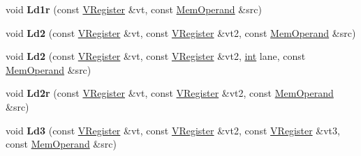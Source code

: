 \begin{DoxyCompactItemize}
\item 
\mbox{\label{classv8_1_1internal_1_1MacroAssembler_aecf9ff406b81bcdd68ef0f9923f365d9}} 
void {\bfseries Ld1r} (const \mbox{\hyperlink{classv8_1_1internal_1_1VRegister}{V\+Register}} \&vt, const \mbox{\hyperlink{classv8_1_1internal_1_1MemOperand}{Mem\+Operand}} \&src)
\item 
\mbox{\label{classv8_1_1internal_1_1MacroAssembler_a29ad0e5ae7627135ffb549f0e2cc3e3e}} 
void {\bfseries Ld2} (const \mbox{\hyperlink{classv8_1_1internal_1_1VRegister}{V\+Register}} \&vt, const \mbox{\hyperlink{classv8_1_1internal_1_1VRegister}{V\+Register}} \&vt2, const \mbox{\hyperlink{classv8_1_1internal_1_1MemOperand}{Mem\+Operand}} \&src)
\item 
\mbox{\label{classv8_1_1internal_1_1MacroAssembler_a8aad478ed21bbff042b26b15b8e39895}} 
void {\bfseries Ld2} (const \mbox{\hyperlink{classv8_1_1internal_1_1VRegister}{V\+Register}} \&vt, const \mbox{\hyperlink{classv8_1_1internal_1_1VRegister}{V\+Register}} \&vt2, \mbox{\hyperlink{classint}{int}} lane, const \mbox{\hyperlink{classv8_1_1internal_1_1MemOperand}{Mem\+Operand}} \&src)
\item 
\mbox{\label{classv8_1_1internal_1_1MacroAssembler_abaae01975749e6f64a98a1503fdacd02}} 
void {\bfseries Ld2r} (const \mbox{\hyperlink{classv8_1_1internal_1_1VRegister}{V\+Register}} \&vt, const \mbox{\hyperlink{classv8_1_1internal_1_1VRegister}{V\+Register}} \&vt2, const \mbox{\hyperlink{classv8_1_1internal_1_1MemOperand}{Mem\+Operand}} \&src)
\item 
\mbox{\label{classv8_1_1internal_1_1MacroAssembler_adec6082ef1ef396d749b9d223c0b1e65}} 
void {\bfseries Ld3} (const \mbox{\hyperlink{classv8_1_1internal_1_1VRegister}{V\+Register}} \&vt, const \mbox{\hyperlink{classv8_1_1internal_1_1VRegister}{V\+Register}} \&vt2, const \mbox{\hyperlink{classv8_1_1internal_1_1VRegister}{V\+Register}} \&vt3, const \mbox{\hyperlink{classv8_1_1internal_1_1MemOperand}{Mem\+Operand}} \&src)
\item 
\mbox{\label{classv8_1_1internal_1_1MacroAssembler_a9b4a8d5676c65c9a50e936ad6ef56418}} 

\end{DoxyCompactItemize}
